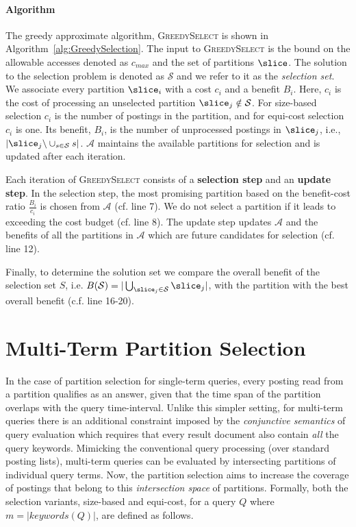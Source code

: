 \paragraph{Algorithm} The greedy approximate algorithm, \textsc{GreedySelect} is shown in
Algorithm~\ref{alg:GreedySelection}. The input to \textsc{GreedySelect} is the bound on the allowable accesses denoted as $c_{max}$ and the set of partitions $\slice$. The solution to the selection problem is denoted as $\mathcal{S}$ and we refer to it as the \emph{selection set}. We associate every partition $\slice_i$ with a cost $c_i$ and a benefit $B_i$. Here, $c_i$ is the cost of processing an unselected partition $\slice_{j} \notin \mathcal{S}$. For size-based selection $c_i$ is the number of postings in the partition, and for equi-cost selection $c_i$ is one. Its benefit, $B_i$, is the number of unprocessed postings in $\slice_{j}$, i.e., $|\slice_{j}\backslash \cup_{s\in\mathcal{S}}s|$. $\mathcal{A}$ maintains the available partitions for selection and is updated after each iteration.


Each iteration of \textsc{GreedySelect} consists of a {\bf selection step} and an \textbf{update step}. In the selection step, the most promising partition based on the benefit-cost ratio $\frac{B_i}{c_i}$ is chosen from $\mathcal{A}$ (cf. line 7). We do not select a partition if it leads to exceeding the cost budget (cf. line 8). The update step updates $\mathcal{A}$ and the benefits of all the partitions in $\mathcal{A}$ which are future candidates for selection (cf. line 12).

Finally, to determine the solution set we compare the overall benefit of the selection set $S$, i.e. $B(\mathcal{S}) = |\bigcup_{\slice_j \in \mathcal{S}}{\slice_{j}}|$, with the partition with the best overall benefit (c.f. line 16-20). 


\section{Multi-Term Partition Selection}
\label{sec:psmtq}

In the case of partition selection for single-term queries, every
posting read from a partition qualifies as an answer, given
that the time span of the partition overlaps with the query time-interval. Unlike this simpler setting, for multi-term queries there is an additional constraint imposed by the \textit{conjunctive semantics} of query evaluation which requires that every result document also contain \emph{all} the query keywords. Mimicking the conventional query processing (over standard posting lists), multi-term queries can be evaluated by intersecting partitions of individual query terms. Now, the partition selection aims to increase the coverage of postings that belong to this \emph{intersection space} of partitions. Formally, both the selection variants, size-based and equi-cost, for a query $Q$ where $m = |keywords(Q)|$, are defined as follows.

